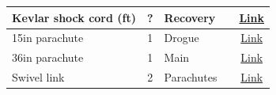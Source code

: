 \begin{table}
\begin{tabular}{| p{2in} | c | p{1in} | p{1in} | c |}
        \hline
        Kevlar shock cord (ft)     & ?        & Recovery                &                                           & \href{https://www.allrockets.ca/Build/Shock-Cords/Kevlar-1500A}{Link}                                                                                                                                                                                                                                                                                                                                                                                                                                                                                                                                         \\
        \hline
        15in parachute             & 1        & Drogue                  &                                           & \href{https://www.allrockets.ca/Build/Parachutes/Nylon-Red-12?cPath=19_212\&}{Link}                                                                                                                                                                                                                                                                                                                                                                                                                                                                                                                           \\
        \hline
        36in parachute             & 1        & Main                    &                                           & \href{https://www.allrockets.ca/Build/Parachutes/36}{Link}                                                                                                                                                                                                                                                                                                                                                                                                                                                                                                                                                    \\
        \hline
        Swivel link                & 2        & Parachutes              &                                           & \href{https://www.allrockets.ca/Build/Swivels-Links/Swivel-8}{Link}                                                                                                                                                                                                                                                                                                                                                                                                                                                                                                                                           \\

\end{tabular}
\end{table}
